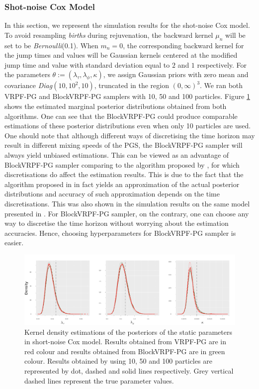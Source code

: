 \documentclass[12pt,a4paper]{article}
\begin{document}
\subsubsection{Shot-noise Cox Model}
In this section, we represent the simulation results for the shot-noise Cox model. To avoid resampling \textit{births} during rejuvenation, the backward kernel \(\mu_n\) will be set to be \textit{Bernoulli}(0.1). When \(m_n = 0\), the corresponding backward kernel for the jump times and values will be Gaussian kernels centered at the modified jump time and value with standard deviation equal to \(2\) and \(1\) respectively. For the parameters \(\theta:=(\lambda_\tau,\lambda_\phi,\kappa)\), we assign Gaussian priors with zero mean and covariance \textit{Diag}\((10,10^2,10)\), truncated in the region \((0,\infty)^3\). We ran both VRPF-PG and BlockVRPF-PG samplers with 10, 50 and 100 particles. Figure \ref{Figure:SNC_Sim_Posterior} shows the estimated marginal posterior distributions obtained from both algorithms. One can see that the BlockVRPF-PG could produce comparable estimations of these posterior distributions even when only 10 particles are used. One should note that although different ways of discretising the time horizon may result in different mixing speeds of the PGS, the BlockVRPF-PG sampler will always yield unbiased estimations. This can be viewed as an advantage of BlockVRPF-PG sampler comparing to the algorithm proposed by \cite{finke2014static}, for which discretisations do affect the estimation results. This is due to the fact that the algorithm proposed in \cite{finke2014static} in fact yields an approximation of the actual posterior distributions and accuracy of such approximation depends on the time discretisations. This was also shown in the simulation results on the same model presented in \cite{finke2014static}. For BlockVRPF-PG sampler, on the contrary, one can choose any way to discretise the time horizon without worrying about the estimation accuracies. Hence, choosing hyperparameters for BlockVRPF-PG sampler is easier. 
\begin{figure}[htb!]
    \centering
    \includegraphics[width=\textwidth]{SNC_Sim_posterior.pdf}
    \caption{Kernel density estimations of the posteriors of the static parameters in short-noise Cox model. Results obtained from VRPF-PG are in red colour and results obtained from BlockVRPF-PG are in green colour. Results obtained by using 10, 50 and 100 particles are represented by dot, dashed and solid lines respectively. Grey vertical dashed lines represent the true parameter values.}
    \label{Figure:SNC_Sim_Posterior}
\end{figure}
\end{document}
